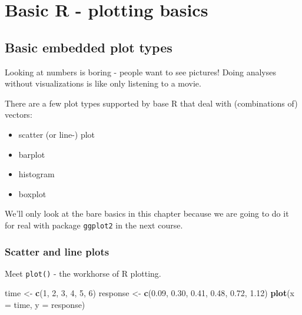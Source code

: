\documentclass[]{book}
\newenvironment{Shaded}{\begin{snugshade}}{\end{snugshade}}
\newcommand{\DataTypeTok}[1]{\textcolor[rgb]{0.13,0.29,0.53}{#1}}
\newcommand{\DecValTok}[1]{\textcolor[rgb]{0.00,0.00,0.81}{#1}}
\newcommand{\FloatTok}[1]{\textcolor[rgb]{0.00,0.00,0.81}{#1}}
\newcommand{\KeywordTok}[1]{\textcolor[rgb]{0.13,0.29,0.53}{\textbf{#1}}}
\newcommand{\NormalTok}[1]{#1}
\newcommand{\StringTok}[1]{\textcolor[rgb]{0.31,0.60,0.02}{#1}}
\providecommand{\tightlist}{%
  \setlength{\itemsep}{0pt}\setlength{\parskip}{0pt}}
\begin{document}
\hypertarget{basic-r---plotting-basics}{%
\chapter{Basic R - plotting basics}\label{basic-r---plotting-basics}}

\hypertarget{basic-embedded-plot-types}{%
\section{Basic embedded plot types}\label{basic-embedded-plot-types}}

Looking at numbers is boring - people want to see pictures! Doing analyses without visualizations is like only listening to a movie.

There are a few plot types supported by base R that deal with (combinations of) vectors:

\begin{itemize}
\tightlist
\item
  scatter (or line-) plot
\item
  barplot
\item
  histogram
\item
  boxplot
\end{itemize}

We'll only look at the bare basics in this chapter because we are going to do it for real with package \texttt{ggplot2} in the next course.

\hypertarget{scatter-and-line-plots}{%
\subsection{Scatter and line plots}\label{scatter-and-line-plots}}

Meet \texttt{plot()} - the workhorse of R plotting.

\begin{Shaded}
\begin{Highlighting}[]
\NormalTok{time <-}\StringTok{ }\KeywordTok{c}\NormalTok{(}\DecValTok{1}\NormalTok{, }\DecValTok{2}\NormalTok{, }\DecValTok{3}\NormalTok{, }\DecValTok{4}\NormalTok{, }\DecValTok{5}\NormalTok{, }\DecValTok{6}\NormalTok{)}
\NormalTok{response <-}\StringTok{ }\KeywordTok{c}\NormalTok{(}\FloatTok{0.09}\NormalTok{, }\FloatTok{0.30}\NormalTok{, }\FloatTok{0.41}\NormalTok{, }\FloatTok{0.48}\NormalTok{, }\FloatTok{0.72}\NormalTok{, }\FloatTok{1.12}\NormalTok{)}
\KeywordTok{plot}\NormalTok{(}\DataTypeTok{x =}\NormalTok{ time, }\DataTypeTok{y =}\NormalTok{ response)}
\end{Highlighting}
\end{Shaded}
\end{document}
